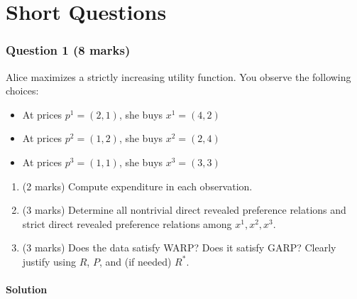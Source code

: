 \documentclass[12pt]{article}
\begin{document}
\bigskip

\newpage
\part{Short Questions}

\section*{Question 1 (8 marks)}

Alice maximizes a strictly increasing utility function. You observe the following choices:
\begin{itemize}
\item At prices $p^1=(2,1)$, she buys $x^1=(4,2)$
\item At prices $p^2=(1,2)$, she buys $x^2=(2,4)$
\item At prices $p^3=(1,1)$, she buys $x^3=(3,3)$
\end{itemize}

\begin{enumerate}[label=(\alph*)]
\item (2 marks) Compute expenditure in each observation.
\item (3 marks) Determine all nontrivial direct revealed preference relations and strict direct revealed preference relations among $x^1,x^2,x^3$.
\item (3 marks) Does the data satisfy WARP? Does it satisfy GARP? Clearly justify using $R$, $P$, and (if needed) $R^*$.
\end{enumerate}

\subsection*{Solution}
\end{document}
